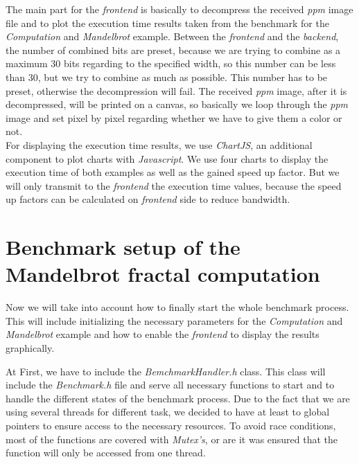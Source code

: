 The main part for the \textit{frontend} is basically to decompress the received \textit{ppm} image file and to plot the execution time results taken from the benchmark for the \textit{Computation} and \textit{Mandelbrot} example. Between the \textit{frontend} and the \textit{backend}, the number of combined bits are preset, because we are trying to combine as a maximum 30 bits regarding to the specified width, so this number can be less than 30, but we try to combine as much as possible. This number has to be preset, otherwise the decompression will fail. The received \textit{ppm} image, after it is decompressed, will be printed on a canvas, so basically we loop through the \textit{ppm} image and set pixel by pixel regarding whether we have to give them a color or not.\\

\noindent For displaying the execution time results, we use \textit{ChartJS}, an additional component to plot charts with \textit{Javascript}. We use four charts to display the execution time of both examples as well as the gained speed up factor. But we will only transmit to the \textit{frontend} the execution time values, because the speed up factors can be calculated on \textit{frontend} side to reduce bandwidth.

\newpage

\section{Benchmark setup of the Mandelbrot fractal computation} \label{chap:benchmarkSetup}

Now we will take into account how to finally start the whole benchmark process. This will include initializing the necessary parameters for the \textit{Computation} and \textit{Mandelbrot} example and how to enable the \textit{frontend} to display the results graphically.

At First, we have to include the \textit{BemchmarkHandler.h} class. This class will include the \textit{Benchmark.h} file and serve all necessary functions to start and to handle the different states of the benchmark process. Due to the fact that we are using several threads for different task, we decided to have at least to global pointers to ensure access to the necessary resources. To avoid race conditions, most of the functions are covered with \textit{Mutex's}, or are it was ensured that the function will only be accessed from one thread. 


